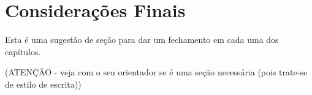 \section{Considerações Finais}
\label{cap:experimentos:resultados:sec:consideracoes:finais}

Esta é uma sugestão de seção para dar um fechamento em cada uma dos capítulos.

(ATENÇÃO - veja com o seu orientador se é uma seção necessária (pois trate-se de estilo de escrita))